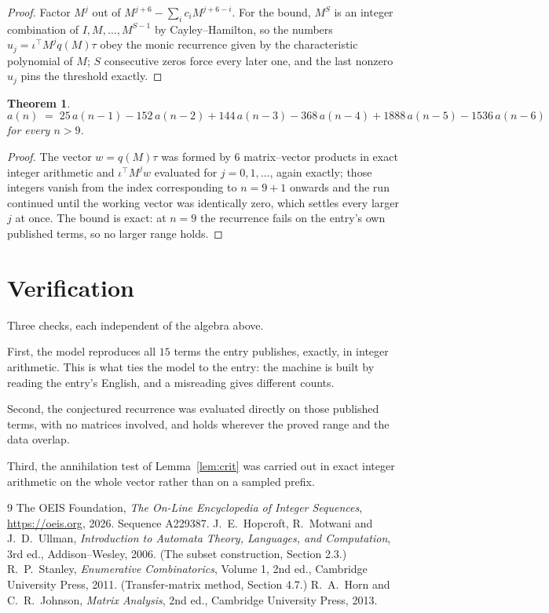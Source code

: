 \documentclass[11pt,a4paper]{article}
\theoremstyle{plain}
\newtheorem{theorem}{Theorem}
\theoremstyle{definition}
\begin{document}
\begin{proof}
Factor $M^{j}$ out of $M^{j+6}-\sum_ic_iM^{j+6-i}$. For the bound, $M^{S}$
is an integer combination of $I,M,\dots,M^{S-1}$ by Cayley--Hamilton, so the numbers
$u_j=\iota^{\!\top}M^{j}q(M)\tau$ obey the monic recurrence given by the characteristic
polynomial of $M$; $S$ consecutive zeros force every later one, and the last nonzero $u_j$
pins the threshold exactly.
\end{proof}

\begin{theorem}
\[
a(n)\;=\;25\,a(n-1) - 152\,a(n-2) + 144\,a(n-3) - 368\,a(n-4) + 1888\,a(n-5) - 1536\,a(n-6)
\]
for every $n>9$.
\end{theorem}

\begin{proof}
The vector $w=q(M)\tau$ was formed by $6$ matrix--vector products in exact integer
arithmetic and $\iota^{\!\top}M^{j}w$ evaluated for $j=0,1,\dots$, again exactly; those
integers vanish from the index corresponding to $n=9+1$ onwards and the run continued
until the working vector was identically zero, which settles every larger $j$ at once. The bound is exact: at $n=9$ the recurrence fails on the entry's own published terms, so no larger range holds.
\end{proof}

\section{Verification}

Three checks, each independent of the algebra above.

First, the model reproduces all $15$ terms the entry publishes, exactly, in integer
arithmetic. This is what ties the model to the entry: the machine is built by reading the
entry's English, and a misreading gives different counts.

Second, the conjectured recurrence was evaluated directly on those published terms, with no
matrices involved, and holds wherever the proved range and the data overlap.

Third, the annihilation test of Lemma~\ref{lem:crit} was carried out in exact integer
arithmetic on the whole vector rather than on a sampled prefix.

\begin{thebibliography}{9}
 The OEIS Foundation, \emph{The On-Line Encyclopedia of Integer
Sequences}, \url{https://oeis.org}, 2026. Sequence A229387.
 J.~E.~Hopcroft, R.~Motwani and J.~D.~Ullman, \emph{Introduction to Automata
Theory, Languages, and Computation}, 3rd ed., Addison--Wesley, 2006. (The subset
construction, Section 2.3.)
 R.~P.~Stanley, \emph{Enumerative Combinatorics}, Volume 1, 2nd ed.,
Cambridge University Press, 2011. (Transfer-matrix method, Section 4.7.)
 R.~A.~Horn and C.~R.~Johnson, \emph{Matrix Analysis}, 2nd ed., Cambridge
University Press, 2013.
\end{thebibliography}
\end{document}
